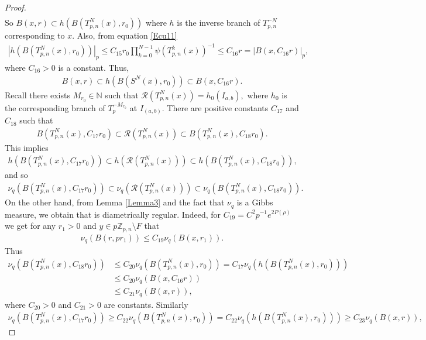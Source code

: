 \documentclass[11pt]{amsart}
\theoremstyle{remark}
\numberwithin{equation}{section}
\newcommand{\Z}{\mathbb{Z}}
\begin{document}
\begin{proof}
\begin{align*}
\end{align*}So $B(x,r)\subset h(B(T^{N}_{p,n}(x),r_{0}))$ where $h$ is the inverse branch of $T^{-N}_{p,n}$ corresponding to $x$. Also, from equation \eqref{Ecu11}
\begin{align*}
    \left|h(B(T^{N}_{p,n}(x),r_{0}))\right|_{p}\leq C_{15}r_{0}\prod^{N-1}_{k=0}\psi(T^{k}_{p,n}(x))^{-1}\leq C_{16}r=|B(x,C_{16}r)|_{p},
\end{align*}where $C_{16}>0$ is a constant. Thus,
\begin{align*}
    B(x,r)\subset h(B(S^{N}(x),r_{0})) \subset B(x,C_{16}r).
\end{align*} Recall there exists $M_{r_{0}}\in \mathbb{N}$ such that $\mathcal{R}(T^{N}_{p,n}(x))=h_{0}(I_{a,b}),$ where $h_{0}$ is the corresponding branch of $T_{p}^{-M_{r_{0}}}$ \textcolor{red}{ } at $I_{(a,b)}$.  There are positive constants $C_{17}$ and $C_{18}$ such that 
\begin{align*}
    B(T^{N}_{p,n}(x),C_{17}r_{0})\subset \mathcal{R}(T^{N}_{p,n}(x))\subset B(T^{N}_{p,n}(x),C_{18}r_{0}).
\end{align*} This implies 
\begin{align*}
    h(B(T^{N}_{p,n}(x),C_{17}r_{0}))\subset h(\mathcal{R}(T^{N}_{p,n}(x)))\subset h(B(T^{N}_{p,n}(x),C_{18}r_{0})), 
\end{align*}and so 
\begin{align}\label{Ecu12}
    \nu_{q}(B(T^{N}_{p,n}(x),C_{17}r_{0}))\subset \nu_{q}(\mathcal{R}(T^{N}_{p,n}(x)))\subset \nu_{q}(B(T^{N}_{p,n}(x),C_{18}r_{0})).
\end{align} On the other hand, from Lemma \ref{Lemma3} and the fact that $\nu_{q}$ is a Gibbs measure, we obtain that is diametrically regular. Indeed, for $C_{19}=C^{2}p^{-1}e^{2P(\rho)}$ we get for any $r_{1}>0$ and $y\in p\Z_{p,n}\setminus F$ that
\begin{align*}
    \nu_{q}(B(r,pr_{1}))\leq C_{19}\nu_{q}(B(x,r_{1})).
\end{align*}Thus
\begin{align*}
    \nu_{q}(B(T^{N}_{p,n}(x),C_{18}r_{0}))&\leq C_{20}\nu_{q}(B(T^{N}_{p,n}(x),r_{0}))=C_{17}\nu_{q}(h(B(T^{N}_{p,n}(x),r_{0})))\\
    & \leq C_{20}\nu_{q}(B(x,C_{16}r))\\
    &\leq C_{21}\nu_{q}(B(x,r)),
\end{align*}where $C_{20}>0$ and $C_{21}>0$ are constants. Similarly
\begin{align*}
    \nu_{q}(B(T^{N}_{p,n}(x),C_{17}r_{0}))\geq C_{22}\nu_{q}(B(T^{N}_{p,n}(x),r_{0}))=C_{22}\nu_{q}(h(B(T^{N}_{p,n}(x),r_{0})))\geq C_{23}\nu_{q}(B(x,r)),

\end{align*}
\end{proof}
\end{document}
